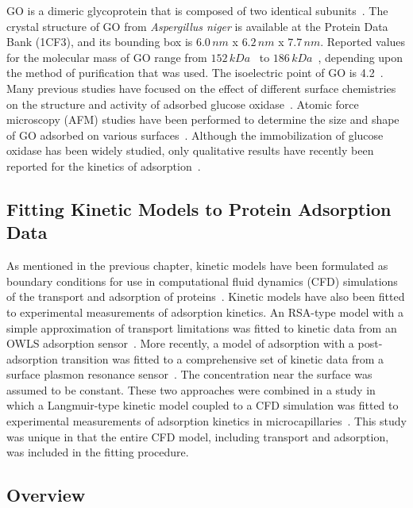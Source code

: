 GO is a dimeric glycoprotein that is composed of two identical subunits~\cite{Wohlfahrt1999}.
The crystal structure of GO from \emph{Aspergillus niger} is available
at the Protein Data Bank (1CF3), and its bounding box is $6.0\, nm$
x $6.2\, nm$ x $7.7\, nm$. Reported values for the molecular mass
of GO range from $152\, kDa$~\cite{Keilin1948} to $186\, kDa$~\cite{Swoboda1965},
depending upon the method of purification that was used. The isoelectric
point of GO is 4.2~\cite{Pazur1964}. Many previous studies have
focused on the effect of different surface chemistries on the structure
and activity of adsorbed glucose oxidase~\cite{Fears2009,Dong1997}.
Atomic force microscopy (AFM) studies have been performed to determine
the size and shape of GO adsorbed on various surfaces~\cite{Muguruma2006,Otsuka2004}.
Although the immobilization of glucose oxidase has been widely studied,
only qualitative results have recently been reported for the kinetics
of adsorption~\cite{Muguruma2006}.


\subsection{Fitting Kinetic Models to Protein Adsorption Data}

As mentioned in the previous chapter, kinetic models have been formulated
as boundary conditions for use in computational fluid dynamics (CFD)
simulations of the transport and adsorption of proteins~\cite{Glaser1993,Edwards1999}.
Kinetic models have also been fitted to experimental measurements
of adsorption kinetics. An RSA-type model with a simple approximation
of transport limitations was fitted to kinetic data from an OWLS adsorption
sensor~\cite{Kurrat1994}. More recently, a model of adsorption with
a post-adsorption transition \cite{Lundstroem1984} was fitted to
a comprehensive set of kinetic data from a surface plasmon resonance
sensor~\cite{Michael2003}. The concentration near the surface was
assumed to be constant. These two approaches were combined in a study
in which a Langmuir-type kinetic model coupled to a CFD simulation
was fitted to experimental measurements of adsorption kinetics in
microcapillaries~\cite{Jenkins2004}. This study was unique in that
the entire CFD model, including transport and adsorption, was included
in the fitting procedure.


\subsection{Overview}

